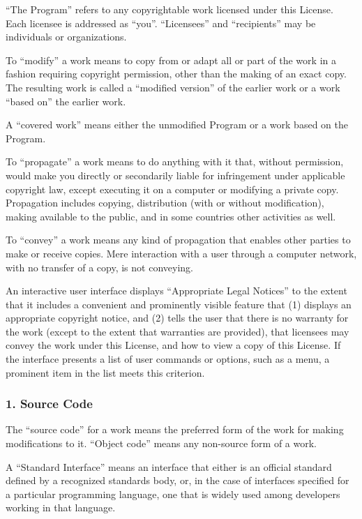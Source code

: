 \documentclass[a4paper, 11pt, twoside]{article}
\begin{document}
“The Program” refers to any copyrightable work licensed under this License. Each licensee is addressed as “you”. “Licensees” and “recipients” may be individuals or organizations.

To “modify” a work means to copy from or adapt all or part of the work in a fashion requiring copyright permission, other than the making of an exact copy. The resulting work is called a “modified version” of the earlier work or a work “based on” the earlier work.

A “covered work” means either the unmodified Program or a work based on the Program.

To “propagate” a work means to do anything with it that, without permission, would make you directly or secondarily liable for infringement under applicable copyright law, except executing it on a computer or modifying a private copy. Propagation includes copying, distribution (with or without modification), making available to the public, and in some countries other activities as well.

To “convey” a work means any kind of propagation that enables other parties to make or receive copies. Mere interaction with a user through a computer network, with no transfer of a copy, is not conveying.

An interactive user interface displays “Appropriate Legal Notices” to the extent that it includes a convenient and prominently visible feature that (1) displays an appropriate copyright notice, and (2) tells the user that there is no warranty for the work (except to the extent that warranties are provided), that licensees may convey the work under this License, and how to view a copy of this License. If the interface presents a list of user commands or options, such as a menu, a prominent item in the list meets this criterion.

\subsubsection{1. Source Code}

The “source code” for a work means the preferred form of the work for making modifications to it. “Object code” means any non-source form of a work.

A “Standard Interface” means an interface that either is an official standard defined by a recognized standards body, or, in the case of interfaces specified for a particular programming language, one that is widely used among developers working in that language.
\end{document}
